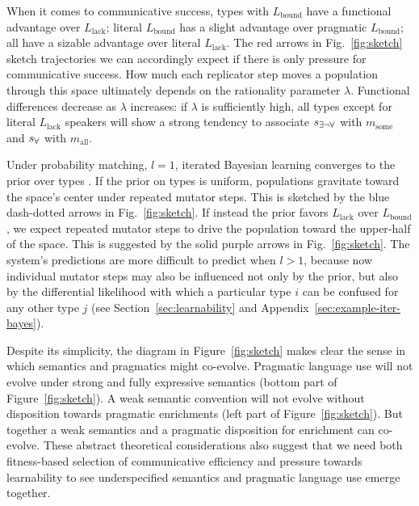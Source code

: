 \documentclass[a4paper, 11pt]{article}
\theoremstyle{Satz}
\newcommand{\state}{\ensuremath{s}\xspace}		%
\newcommand{\mystate}[1]{\ensuremath{\state_{\text{#1}}}\xspace} %
\newcommand{\mylang}[1]{\ensuremath{L_{\text{#1}}}\xspace} %
\newcommand{\messg}{\ensuremath{m}\xspace}		%
\newcommand{\mymessg}[1]{\ensuremath{\messg_{\text{#1}}}\xspace} %
\newcommand{\ssome}{\mystate{\ensuremath{\exists\neg\forall}}}
\newcommand{\sall}{\mystate{\ensuremath{\forall}}}
\newcommand{\msome}{\mymessg{some}}
\newcommand{\mall}{\mymessg{all}}
\newcommand{\Lbound}{\mylang{bound}}
\newcommand{\Llack}{\mylang{lack}}
\begin{document}
When it comes to communicative success, types with $\Lbound$ have a functional advantage over
$\Llack$; literal $\Lbound$ has a slight advantage over pragmatic $\Lbound$; all have a sizable
advantage over literal $\Llack$. The red arrows in Fig.~\ref{fig:sketch} sketch trajectories we
can accordingly expect if there is only pressure for communicative success. How much each replicator step
moves a population through this space ultimately depends on the rationality parameter
$\lambda$. Functional differences decrease as $\lambda$ increases: if $\lambda$ is sufficiently
high, all types except for literal $\Llack$ speakers will show a strong tendency to associate
$\ssome$ with $\msome$ and $\sall$ with $\mall$.

Under probability matching, $l=1$, iterated Bayesian learning converges to the prior over types
\citep{griffiths+kalish:2007}. If the prior on types is uniform, populations gravitate toward
the space's center under repeated mutator steps. This is sketched by the blue dash-dotted
arrows in Fig.~\ref{fig:sketch}. If instead the prior favors $\Llack$ over $\Lbound$, we expect
repeated mutator steps to drive the population toward the upper-half of the space. This is
suggested by the solid purple arrows in Fig.~\ref{fig:sketch}. The system's predictions are
more difficult to predict when $l>1$, because now individual mutator steps may also be
influenced not only by the prior, but also by the differential likelihood with which a
particular type $i$ can be confused for any other type $j$ (see Section~\ref{sec:learnability}
and Appendix~\ref{sec:example-iter-bayes}).

Despite its simplicity, the diagram in Figure~\ref{fig:sketch} makes clear the sense in which
semantics and pragmatics might co-evolve. Pragmatic language use will not evolve under strong
and fully expressive semantics (bottom part of Figure~\ref{fig:sketch}). A weak semantic
convention will not evolve without disposition towards pragmatic enrichments (left part of
Figure~\ref{fig:sketch}). But together a weak semantics and a pragmatic disposition for
enrichment can co-evolve. These abstract theoretical considerations also suggest that we need
both fitness-based selection of communicative efficiency and pressure towards learnability to
see underspecified semantics and pragmatic language use emerge together.
\end{document}
